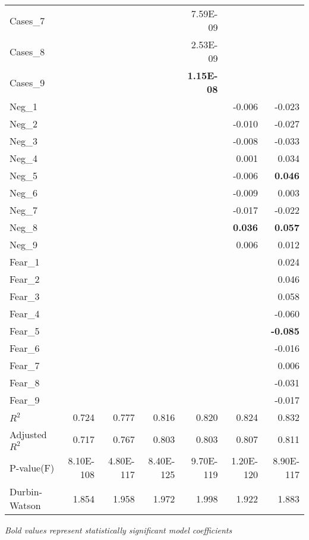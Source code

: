 \begin{longtable}[c]{@{}lrrrrrr@{}}
Cases\_7 &  &  &  & 7.59E-09 &  &  \\
Cases\_8 &  &  &  & 2.53E-09 &  &  \\
Cases\_9 &  &  &  & \textbf{1.15E-08} &  &  \\
Neg\_1 &  &  &  &  & -0.006 & -0.023 \\
Neg\_2 &  &  &  &  & -0.010 & -0.027 \\
Neg\_3 &  &  &  &  & -0.008 & -0.033 \\
Neg\_4 &  &  &  &  & 0.001 & 0.034 \\
Neg\_5 &  &  &  &  & -0.006 & \textbf{0.046} \\
Neg\_6 &  &  &  &  & -0.009 & 0.003 \\
Neg\_7 &  &  &  &  & -0.017 & -0.022 \\
Neg\_8 &  &  &  &  & \textbf{0.036} & \textbf{0.057} \\
Neg\_9 &  &  &  &  & 0.006 & 0.012 \\
Fear\_1 &  &  &  &  &  & 0.024 \\
Fear\_2 &  &  &  &  &  & 0.046 \\
Fear\_3 &  &  &  &  &  & 0.058 \\
Fear\_4 &  &  &  &  &  & -0.060 \\
Fear\_5 &  &  &  &  &  & \textbf{-0.085} \\
Fear\_6 &  &  &  &  &  & -0.016 \\
Fear\_7 &  &  &  &  &  & 0.006 \\
Fear\_8 &  &  &  &  &  & -0.031 \\
Fear\_9 &  &  &  &  &  & -0.017 \\
$R^2$ & 0.724 & 0.777 & 0.816 & 0.820 & 0.824 & 0.832 \\
Adjusted $R^2$ & 0.717 & 0.767 & 0.803 & 0.803 & 0.807 & 0.811 \\
P-value(F) & 8.10E-108 & 4.80E-117 & 8.40E-125 & 9.70E-119 & 1.20E-120 & 8.90E-117 \\
Durbin-Watson & 1.854 & 1.958 & 1.972 & 1.998 & 1.922 & 1.883 \\* \bottomrule
\end{longtable}
\emph{Bold values represent statistically significant model coefficients}

